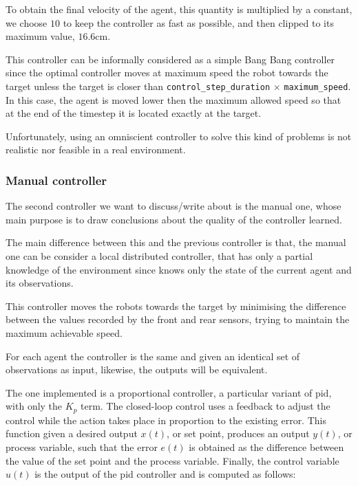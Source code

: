 \noindent
To obtain the final velocity of the agent, this quantity is multiplied by a constant, 
we choose $10$ to keep the controller as fast as possible, and then clipped to its 
maximum value, $16.6$\gls{cm}.

This controller can be informally considered as a simple Bang Bang controller 
since the optimal controller moves at maximum speed the robot towards the 
target unless the target is closer than %
\texttt{control\_step\_duration} $\times$ \texttt{maximum\_speed}. In this case, 
the agent is moved lower then the maximum allowed speed so that at the end of 
the timestep it is located exactly at the target.

Unfortunately, using an omniscient controller to solve this kind of problems is not 
realistic nor feasible in a real environment.

\subsubsection{Manual controller}
\label{subsubsec:manual}
The second controller we want to discuss/write about is the manual one, whose 
main purpose is to draw conclusions about the quality of the controller learned.

The main difference between this and the previous controller is that, the manual 
one can be consider a local distributed controller, that has only a partial 
knowledge of the environment since knows only the state of the current agent 
and its observations.

This controller moves the robots towards the target by minimising the difference 
between the values recorded by the front and rear sensors, trying to maintain the 
maximum achievable speed.

For each agent the controller is the same and given an identical set of 
observations as input, likewise, the outputs will be equivalent.

The one implemented is a proportional controller, a particular variant of \gls{pid}, 
with only the $K_p$ term. 
The closed-loop control uses a feedback to adjust the control while the action 
takes place in proportion to the existing error. This function given a desired 
output $x(t)$, or set point, produces an output $y(t)$, or process variable, such 
that the error $e(t)$ is obtained as the difference between the value of the set 
point and the process variable. Finally, the control variable $u(t)$ is the output of 
the \gls{pid} controller and is computed as follows:

